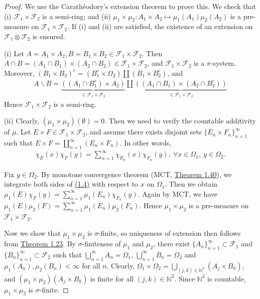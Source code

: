 \documentclass{article}
\numberwithin{equation}{section}
\theoremstyle{plain}
\theoremstyle{definition}
\begin{document}
\begin{proof}
We use the Carathéodory's extension theorem to prove this. We check that (i) $\mathscr{F}_1\times\mathscr{F}_2$ is a semi-ring; and (ii) $\mu_1\times\mu_2:A_1\times A_2\mapsto \mu_1(A_1)\mu_2(A_2)$ is a pre-measure on $\mathscr{F}_1\times\mathscr{F}_2$. If (i) and (ii) are satisfied, the existence of an extension on $\mathscr{F}_1\otimes\mathscr{F}_2$ is ensured.\vspace{0.1cm}

(i) Let $A=A_1\times A_2,B=B_1\times B_2\in\mathscr{F}_1\times\mathscr{F}_2$. Then $A\cap B=(A_1\cap B_1)\times(A_2\cap B_2)\in\mathscr{F}_1\times\mathscr{F}_2$, and $\mathscr{F}_1\times\mathscr{F}_2$ is a $\pi$-system. Moreover, $(B_1\times B_2)^c=(B_1^c\times\Omega_2)\amalg(B_1\times B_2^c)$, and
\begin{align*}
	A\backslash B = \underbrace{\left((A_1\cap B_1^c)\times A_2\right)}_{\in\mathscr{F}_1\times\mathscr{F}_2}\amalg\underbrace{\left((A_1\cap B_1)\times(A_2\cap B_2^c)\right)}_{\in\mathscr{F}_1\times\mathscr{F}_2}
\end{align*}
Hence $\mathscr{F}_1\times\mathscr{F}_2$ is a semi-ring.\vspace{0.1cm}

(ii) Clearly, $(\mu_1\times\mu_2)(\emptyset)=0$. Then we need to verify the countable additivity of $\mu$. Let $E\times F\in\mathscr{F}_1\times\mathscr{F}_2$, and assume there exists disjoint sets $\{E_n\times F_n\}_{n=1}^\infty$ such that $E\times F=\coprod_{n=1}^\infty(E_n\times F_n)$. In other words,
\begin{align*}
	\chi_{E}(x)\chi_F(y)=\sum_{n=1}^\infty\chi_{E_n}(x)\chi_{F_n}(y),\ \forall x\in\Omega_1,\ y\in\Omega_2.\label{eq:1.4}\tag{1.4}
\end{align*}

Fix $y\in\Omega_2$. By monotone convergence theorem (MCT, \hyperref[thm:1.40]{Theorem 1.40}), we integrate both sides of \hyperref[eq:1.4]{(1.4)} with respect to $x$ on $\Omega_1$. Then we obtain $\mu_1(E)\chi_F(y)=\sum_{n=1}^\infty\mu_1(E_n)\chi_{F_n}(y)$. Again by MCT, we have $\mu_1(E)\mu_2(F)=\sum_{n=1}^\infty\mu_1(E_n)\mu_2(F_n)$. Hence $\mu_1\times\mu_2$ is a pre-measure on $\mathscr{F}_1\times\mathscr{F}_2$.\vspace{0.1cm}

Now we show that $\mu_1\times\mu_2$ is $\sigma$-finite, so uniqueness of extension then follows from \hyperref[thm:1.23]{Theorem 1.23}. By $\sigma$-finiteness of $\mu_1$ and $\mu_2$, there exist $\{A_n\}_{n=1}^\infty\subset\mathscr{F}_1$ and $\{B_n\}_{n=1}^\infty\subset\mathscr{F}_2$ such that $\bigcup_{n=1}^\infty A_n=\Omega_1$, $\bigcup_{n=1}^\infty B_n=\Omega_2$ and $\mu_1(A_n),\mu_2(B_n)<\infty$ for all $n$. Clearly, $\Omega_1\times\Omega_2=\bigcup_{(j,k)\in\mathbb{N}^2} (A_j\times B_k)$, and $(\mu_1\times\mu_2)(A_j\times B_k)$ is finite for all $(j,k)\in\mathbb{N}^2$. Since $\mathbb{N}^2$ is countable, $\mu_1\times\mu_2$ is $\sigma$-finite.
\end{proof}
\end{document}
